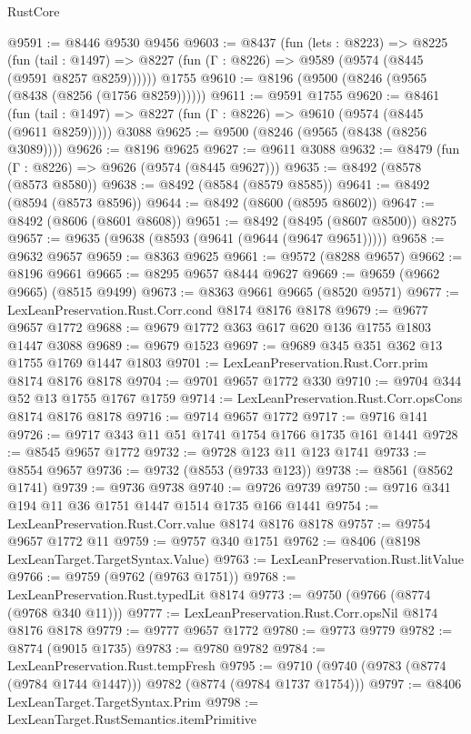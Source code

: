 \begin{lexlean}{RustCore}
\begin{coremodule}
@9591 := @8446 @9530 @9456
@9603 := @8437
    (fun (lets : @8223) =>
    @8225
      (fun (tail : @1497) => @8227 (fun (Γ : @8226) => @9589 (@9574 (@8445 (@9591 @8257 @8259))))))
    @1755
@9610 := @8196 (@9500 (@8246 (@9565 (@8438 (@8256 (@1756 @8259))))))
@9611 := @9591 @1755
@9620 := @8461
    (fun (tail : @1497) => @8227 (fun (Γ : @8226) => @9610 (@9574 (@8445 (@9611 @8259)))))
    @3088
@9625 := @9500 (@8246 (@9565 (@8438 (@8256 @3089))))
@9626 := @8196 @9625
@9627 := @9611 @3088
@9632 := @8479 (fun (Γ : @8226) => @9626 (@9574 (@8445 @9627)))
@9635 := @8492 (@8578 (@8573 @8580))
@9638 := @8492 (@8584 (@8579 @8585))
@9641 := @8492 (@8594 (@8573 @8596))
@9644 := @8492 (@8600 (@8595 @8602))
@9647 := @8492 (@8606 (@8601 @8608))
@9651 := @8492 (@8495 (@8607 @8500)) @8275
@9657 := @9635 (@9638 (@8593 (@9641 (@9644 (@9647 @9651)))))
@9658 := @9632 @9657
@9659 := @8363 @9625
@9661 := @9572 (@8288 @9657)
@9662 := @8196 @9661
@9665 := @8295 @9657 @8444 @9627
@9669 := @9659 (@9662 @9665) (@8515 @9499)
@9673 := @8363 @9661 @9665 (@8520 @9571)
@9677 := LexLeanPreservation.Rust.Corr.cond @8174 @8176 @8178
@9679 := @9677 @9657 @1772
@9688 := @9679 @1772 @363 @617 @620 @136 @1755 @1803 @1447 @3088
@9689 := @9679 @1523
@9697 := @9689 @345 @351 @362 @13 @1755 @1769 @1447 @1803
@9701 := LexLeanPreservation.Rust.Corr.prim @8174 @8176 @8178
@9704 := @9701 @9657 @1772 @330
@9710 := @9704 @344 @52 @13 @1755 @1767 @1759
@9714 := LexLeanPreservation.Rust.Corr.opsCons @8174 @8176 @8178
@9716 := @9714 @9657 @1772
@9717 := @9716 @141
@9726 := @9717 @343 @11 @51 @1741 @1754 @1766 @1735 @161 @1441
@9728 := @8545 @9657 @1772
@9732 := @9728 @123 @11 @123 @1741
@9733 := @8554 @9657
@9736 := @9732 (@8553 (@9733 @123))
@9738 := @8561 (@8562 @1741)
@9739 := @9736 @9738
@9740 := @9726 @9739
@9750 := @9716 @341 @194 @11 @36 @1751 @1447 @1514 @1735 @166 @1441
@9754 := LexLeanPreservation.Rust.Corr.value @8174 @8176 @8178
@9757 := @9754 @9657 @1772 @11
@9759 := @9757 @340 @1751
@9762 := @8406 (@8198 LexLeanTarget.TargetSyntax.Value)
@9763 := LexLeanPreservation.Rust.litValue
@9766 := @9759 (@9762 (@9763 @1751))
@9768 := LexLeanPreservation.Rust.typedLit @8174
@9773 := @9750 (@9766 (@8774 (@9768 @340 @11)))
@9777 := LexLeanPreservation.Rust.Corr.opsNil @8174 @8176 @8178
@9779 := @9777 @9657 @1772
@9780 := @9773 @9779
@9782 := @8774 (@9015 @1735)
@9783 := @9780 @9782
@9784 := LexLeanPreservation.Rust.tempFresh
@9795 := @9710 (@9740 (@9783 (@8774 (@9784 @1744 @1447))) @9782 (@8774 (@9784 @1737 @1754)))
@9797 := @8406 LexLeanTarget.TargetSyntax.Prim
@9798 := LexLeanTarget.RustSemantics.itemPrimitive

\end{coremodule}
\end{lexlean}
